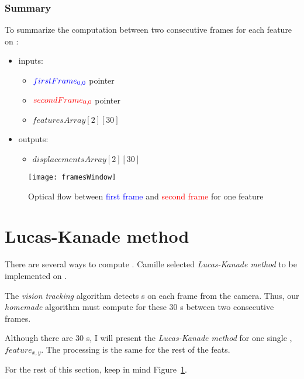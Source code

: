 \subsubsection{Summary}

To summarize the \flow{} computation between two consecutive frames for each feature on \vc:
\begin{itemize}
	\item inputs:
		\begin{itemize}
			\item $\textcolor{blue}{firstFrame_{0,0}}$ pointer
			\item $\textcolor{red}{secondFrame_{0,0}}$ pointer
			\item {} $featuresArray[2][30]$
		\end{itemize}
	\item outputs:
		\begin{itemize}
			\item {} $displacementsArray[2][30]$
		\end{itemize}
\end{itemize}

\begin{figure}[!htbp]
	\centering
	\texttt{[image: framesWindow]}
	\caption{Optical flow between \textcolor{blue}{first frame} and \textcolor{red}{second frame} for one feature}
	\label{framesWindowFig}
\end{figure}
\FloatBarrier


\section{Lucas-Kanade method}

There are several ways to compute \flow{}. Camille selected \emph{Lucas-Kanade method} to be implemented on \vc.

The \emph{vision tracking} algorithm detects  \feat{}s on each frame from the camera. Thus, our \emph{homemade} algorithm must compute \flow{} for these 30 \feat{}s between two consecutive frames.

Although there are 30 \feat{}s, I will present the \emph{Lucas-Kanade method} for one single \feat{}, $feature_{x,y}$. The processing is the same for the rest of the feat{}s.

For the rest of this section, keep in mind Figure~\ref{framesWindowFig}.

